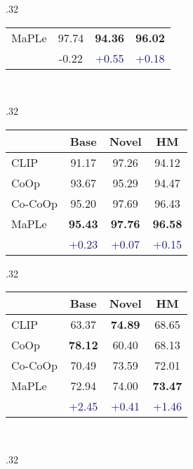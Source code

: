 \documentclass[10pt,twocolumn,letterpaper]{article}
\begin{document}
\begin{table*}[t!]
\begin{subtable}[t]{.32\textwidth}
\begin{tabular}{l cc|c}
    \midrule
    \rowcolor{tabhighlight}
    MaPLe & 97.74 & \textbf{94.36} & \textbf{96.02} \\
      &  \textcolor{Bittersweet}{{-0.22}} &  \textcolor{MidnightBlue}{{+0.55}} &  \textcolor{MidnightBlue}{{+0.18}} \\
    \bottomrule
    \end{tabular}
    \end{subtable}
    ~
    \begin{subtable}[t]{.32\textwidth}
    \centering
    \caption{OxfordPets}
    \begin{tabular}{l cc|c}
    \toprule
    & Base & Novel & HM \\
    \midrule
    CLIP & 91.17 & 97.26 & 94.12 \\
    CoOp & 93.67 & 95.29 & 94.47 \\
    Co-CoOp & {95.20} & {97.69} & {96.43} \\
    \midrule
        \rowcolor{tabhighlight}
    MaPLe & \textbf{95.43} & \textbf{97.76} & \textbf{96.58} \\
     &  \textcolor{MidnightBlue}{{+0.23}} &  \textcolor{MidnightBlue}{{+0.07}} &  \textcolor{MidnightBlue}{{+0.15}} \\
    \bottomrule
    \end{tabular}
    \end{subtable}
    \vspace{1em}
    \begin{subtable}[t]{.32\textwidth}
    \centering
    \caption{StanfordCars}
    \begin{tabular}{l cc|c}
    \toprule
    & Base & Novel & HM \\
    \midrule
    CLIP & 63.37 & \textbf{74.89} & 68.65 \\
    CoOp & \textbf{78.12} & 60.40 & 68.13 \\
    Co-CoOp & 70.49 & 73.59 & {72.01} \\
    \midrule
        \rowcolor{tabhighlight}
    MaPLe & 72.94 & 74.00 & \textbf{73.47} \\
    &  \textcolor{MidnightBlue}{{+2.45}} &  \textcolor{MidnightBlue}{{+0.41}} &  \textcolor{MidnightBlue}{{+1.46}} \\
    \bottomrule
    \end{tabular}
    \end{subtable}
    ~
    \begin{subtable}[t]{.32\textwidth}
    \centering
    \caption{Flowers102}
    \begin{tabular}{l cc|c}
    \toprule

\end{tabular}
\end{subtable}
\end{table*}
\end{document}
